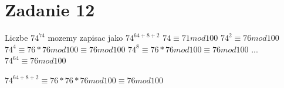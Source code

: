 \documentclass[12pt]{article}
\begin{document}
\section{Zadanie 12}

Liczbe $74^{74}$ mozemy zapisac jako $74^{64+8+2}$ 
$74 \equiv 71 mod 100$
$74^2 \equiv 76 mod 100$
$74^4 \equiv 76*76 mod 100 \equiv 76 mod 100$
$74^8 \equiv 76*76 mod 100 \equiv 76 mod 100$
...
$74^{64} \equiv 76 mod 100$

$74^{64+8+2} \equiv 76*76*76 mod 100 \equiv 76 mod 100$


\egroup
\end{document}
